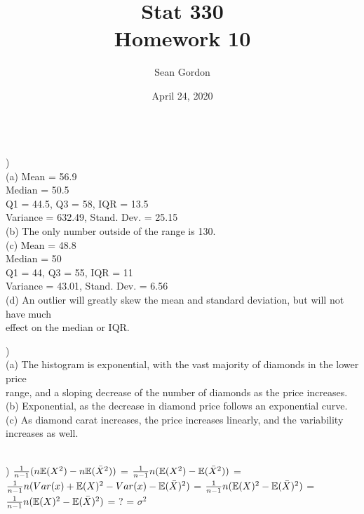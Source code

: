 \documentclass[12pt]{article}
\title{Stat 330\\Homework 10}
\author{Sean Gordon}
\date{April 24, 2020}
\begin{document}
\maketitle


\noindent\hrulefill \\[-.8em]


)\\
\indent (a) Mean = 56.9\\
\indent \indent Median = 50.5\\
\indent \indent Q1 = 44.5, Q3 = 58, IQR = 13.5\\
\indent \indent Variance = 632.49, Stand. Dev. = 25.15\\

\indent (b) The only number outside of the range is 130.\\

\indent (c) Mean = 48.8\\
\indent \indent Median = 50\\
\indent \indent Q1 = 44, Q3 = 55, IQR = 11\\
\indent \indent Variance = 43.01, Stand. Dev. = 6.56\\

\indent (d) An outlier will greatly skew the mean and standard deviation, but will not have much\\
\indent \indent effect on the median or IQR.\\


\noindent \hrulefill 


)\\
\indent (a) The histogram is exponential, with the vast majority of diamonds in the lower price \\
\indent \indent range, and a sloping decrease of the number of diamonds as the price increases.\\

\indent (b) Exponential, as the decrease in diamond price follows an exponential curve.\\

\indent (c) As diamond carat increases, the price increases linearly, and the variability \\
\indent \indent increases as well.\\


\noindent \hrulefill \\
\pagebreak


)  ${\Large \frac{1}{n-1}}(n\mathbb{E}(X^2) - n\mathbb{E}(\bar{X}^2))$ = ${\Large \frac{1}{n-1}}n(\mathbb{E}(X^2) - \mathbb{E}(\bar{X}^2))$ = \\[.4em]
\indent  ${\Large \frac{1}{n-1}}n(Var(x) + \mathbb{E}(X)^2 - Var(x) - \mathbb{E}(\bar{X})^2)$ = ${\Large \frac{1}{n-1}}n(\mathbb{E}(X)^2 - \mathbb{E}(\bar{X})^2)$ = \\[.4em]
\indent  ${\Large \frac{1}{n-1}}n(\mathbb{E}(X)^2 - \mathbb{E}(\bar{X})^2)$ = ? = $\sigma^2$\\
\end{document}
